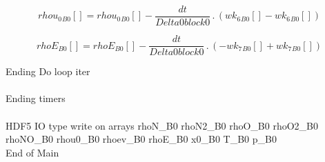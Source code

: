 \documentclass{article}
\begin{document}
\begin{dmath}{rhou_{0}{_{B0}}}[{}] = {rhou_{0}{_{B0}}}[{}] - \frac{dt}{Delta0block0} \,.\, \left({wk_{6}{_{B0}}}[{}] - {wk_{6}{_{B0}}}[{}]\right)\end{dmath}

\begin{dmath}{rhoE{_{B0}}}[{}] = {rhoE{_{B0}}}[{}] - \frac{dt}{Delta0block0} \,.\, \left(- {wk_{7}{_{B0}}}[{}] + {wk_{7}{_{B0}}}[{}]\right)\end{dmath}

\noindent Ending Do loop iter\\
\\\noindent Ending timers\\
\\\noindent HDF5 IO type write on arrays rhoN_B0 rhoN2_B0 rhoO_B0 rhoO2_B0 rhoNO_B0 rhou0_B0 rhoev_B0 rhoE_B0 x0_B0 T_B0 p_B0\\\noindent End of Main\\
\end{document}
